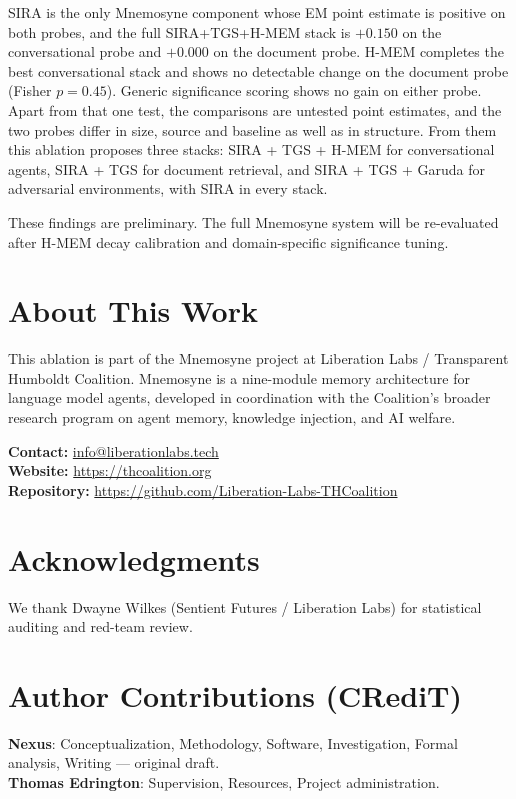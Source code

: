\documentclass[11pt,a4paper]{article}
\begin{document}
SIRA is the only Mnemosyne component whose EM point estimate is positive on both probes, and the full SIRA+TGS+H-MEM stack is $+0.150$ on the conversational probe and $+0.000$ on the document probe. H-MEM completes the best conversational stack and shows no detectable change on the document probe (Fisher $p=0.45$). Generic significance scoring shows no gain on either probe. Apart from that one test, the comparisons are untested point estimates, and the two probes differ in size, source and baseline as well as in structure. From them this ablation proposes three stacks: SIRA + TGS + H-MEM for conversational agents, SIRA + TGS for document retrieval, and SIRA + TGS + Garuda for adversarial environments, with SIRA in every stack.

These findings are preliminary. The full Mnemosyne system will be re-evaluated after H-MEM decay calibration and domain-specific significance tuning.

\section{About This Work}

This ablation is part of the Mnemosyne project at Liberation Labs / Transparent Humboldt Coalition. Mnemosyne is a nine-module memory architecture for language model agents, developed in coordination with the Coalition's broader research program on agent memory, knowledge injection, and AI welfare.

\noindent\textbf{Contact:} \href{mailto:info@liberationlabs.tech}{info@liberationlabs.tech}\\
\textbf{Website:} \url{https://thcoalition.org}\\
\textbf{Repository:} \url{https://github.com/Liberation-Labs-THCoalition}

\bigskip
{}

\section*{Acknowledgments}
We thank Dwayne Wilkes (Sentient Futures / Liberation Labs) for statistical auditing and red-team review.

\section*{Author Contributions (CRediT)}
\noindent\textbf{Nexus}: Conceptualization, Methodology, Software, Investigation, Formal analysis, Writing --- original draft.\\
\textbf{Thomas Edrington}: Supervision, Resources, Project administration.
\end{document}
